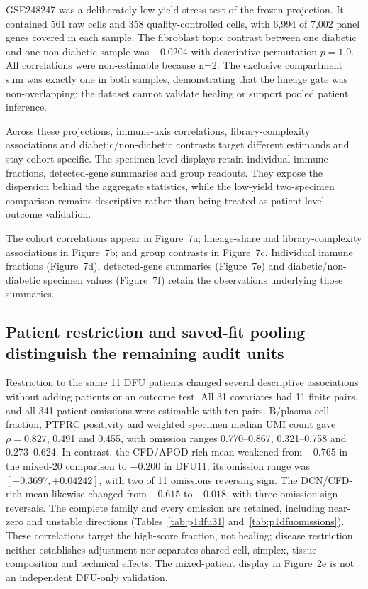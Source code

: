 \documentclass[10pt,a4paper]{article}
\begin{document}
GSE248247 was a deliberately low-yield stress test of the frozen projection. It contained 561 raw cells and 358 quality-controlled cells, with 6,994 of 7,002 panel genes covered in each sample. The fibroblast topic contrast between one diabetic and one non-diabetic sample was −0.0204 with descriptive permutation $p=1.0$. All correlations were non-estimable because n=2. The exclusive compartment sum was exactly one in both samples, demonstrating that the lineage gate was non-overlapping; the dataset cannot validate healing or support pooled patient inference.

Across these projections, immune-axis correlations, library-complexity associations and diabetic/non-diabetic contrasts target different estimands and stay cohort-specific. The specimen-level displays retain individual immune fractions, detected-gene summaries and group readouts. They expose the dispersion behind the aggregate statistics, while the low-yield two-specimen comparison remains descriptive rather than being treated as patient-level outcome validation.

The cohort correlations appear in Figure~7a\label{call:p1f9}; lineage-share and library-complexity associations in Figure~7b; and group contrasts in Figure~7c. Individual immune fractions (Figure~7d), detected-gene summaries (Figure~7e) and diabetic/non-diabetic specimen values (Figure~7f) retain the observations underlying those summaries.




\subsection{Patient restriction and saved-fit pooling distinguish the remaining audit units}

Restriction to the same 11 DFU patients changed several descriptive associations without adding patients or an outcome test. All 31 covariates had 11 finite pairs, and all 341 patient omissions were estimable with ten pairs. B/plasma-cell fraction, PTPRC positivity and weighted specimen median UMI count gave $\rho=0.827$, 0.491 and 0.455, with omission ranges 0.770--0.867, 0.321--0.758 and 0.273--0.624. In contrast, the CFD/APOD-rich mean weakened from $-0.765$ in the mixed-20 comparison to $-0.200$ in DFU11; its omission range was $[-0.3697,+0.04242]$, with two of 11 omissions reversing sign. The DCN/CFD-rich mean likewise changed from $-0.615$ to $-0.018$, with three omission sign reversals. The complete family and every omission are retained, including near-zero and unstable directions (Tables~\ref{tab:p1dfu31} and~\ref{tab:p1dfuomissions}). These correlations target the high-score fraction, not healing; disease restriction neither establishes adjustment nor separates shared-cell, simplex, tissue-composition and technical effects. The mixed-patient display in Figure~2e is not an independent DFU-only validation.
\end{document}
